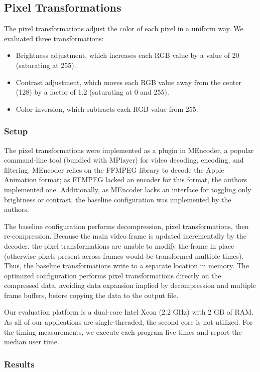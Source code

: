 \subsection{Pixel Transformations}

The pixel transformations adjust the color of each pixel in a uniform
way.  We evaluated three transformations:
\begin{itemize}
\item Brightness adjustment, which increases each RGB value by a value
of 20 (saturating at 255).
\item Contrast adjustment, which moves each RGB value away from the
center (128) by a factor of 1.2 (saturating at 0 and 255).
\item Color inversion, which subtracts each RGB value from 255.
\end{itemize}

\subsubsection{Setup}

The pixel transformations were implemented as a plugin in MEncoder, a
popular command-line tool (bundled with MPlayer) for video decoding,
encoding, and filtering.  MEncoder relies on the FFMPEG library to
decode the Apple Animation format; as FFMPEG lacked an encoder for
this format, the authors implemented one.  Additionally, as MEncoder
lacks an interface for toggling only brightness or contrast, the
baseline configuration was implemented by the authors.

The baseline configuration performs decompression, pixel
transformations, then re-compression.  Because the main video frame is
updated incrementally by the decoder, the pixel transformations are
unable to modify the frame in place (otherwise pixels present across
frames would be transformed multiple times).  Thus, the baseline
transformations write to a separate location in memory.  The optimized
configuration performs pixel transformations directly on the
compressed data, avoiding data expansion implied by decompression and
multiple frame buffers, before copying the data to the output file.

Our evaluation platform is a dual-core Intel Xeon (2.2 GHz) with 2 GB
of RAM.  As all of our applications are single-threaded, the second
core is not utilized.  For the timing measurements, we execute each
program five times and report the median user time.

\subsubsection{Results}

